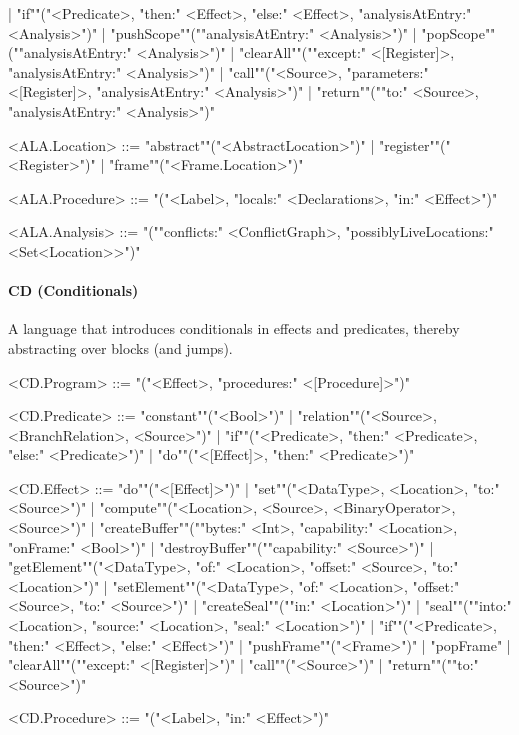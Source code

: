 \documentclass[main.tex]{subfiles}
\begin{document}
\begin{grammar}
						| "if""("<Predicate>, "then:" <Effect>, "else:" <Effect>, "analysisAtEntry:" <Analysis>")"
						| "pushScope""(""analysisAtEntry:" <Analysis>")"
						| "popScope""(""analysisAtEntry:" <Analysis>")"
						| "clearAll""(""except:" <[Register]>, "analysisAtEntry:" <Analysis>")"
						| "call""("<Source>, "parameters:" <[Register]>, "analysisAtEntry:" <Analysis>")"
						| "return""(""to:" <Source>, "analysisAtEntry:" <Analysis>")"
				\par
				<ALA.Location> ::=
						"abstract""("<AbstractLocation>")"
						| "register""("<Register>")"
						| "frame""("<Frame.Location>")"
				\par
				<ALA.Procedure> ::=
							"("<Label>, "locals:" <Declarations>, "in:" <Effect>")"
				\par
				<ALA.Analysis> ::=
							"(""conflicts:" <ConflictGraph>, "possiblyLiveLocations:" <Set<Location>>")"
				\par
\end{grammar}
\par
\paragraph{ CD (Conditionals) } A language that introduces conditionals in effects and predicates, thereby abstracting over blocks (and jumps).
\begin{grammar}
	\footnotesize
				<CD.Program> ::=
							"("<Effect>, "procedures:" <[Procedure]>")"
				\par
				<CD.Predicate> ::=
						"constant""("<Bool>")"
						| "relation""("<Source>, <BranchRelation>, <Source>")"
						| "if""("<Predicate>, "then:" <Predicate>, "else:" <Predicate>")"
						| "do""("<[Effect]>, "then:" <Predicate>")"
				\par
				<CD.Effect> ::=
						"do""("<[Effect]>")"
						| "set""("<DataType>, <Location>, "to:" <Source>")"
						| "compute""("<Location>, <Source>, <BinaryOperator>, <Source>")"
						| "createBuffer""(""bytes:" <Int>, "capability:" <Location>, "onFrame:" <Bool>")"
						| "destroyBuffer""(""capability:" <Source>")"
						| "getElement""("<DataType>, "of:" <Location>, "offset:" <Source>, "to:" <Location>")"
						| "setElement""("<DataType>, "of:" <Location>, "offset:" <Source>, "to:" <Source>")"
						| "createSeal""(""in:" <Location>")"
						| "seal""(""into:" <Location>, "source:" <Location>, "seal:" <Location>")"
						| "if""("<Predicate>, "then:" <Effect>, "else:" <Effect>")"
						| "pushFrame""("<Frame>")"
						| "popFrame"
						| "clearAll""(""except:" <[Register]>")"
						| "call""("<Source>")"
						| "return""(""to:" <Source>")"
				\par
				<CD.Procedure> ::=
							"("<Label>, "in:" <Effect>")"
				\par
\end{grammar}
\par
\end{document}
